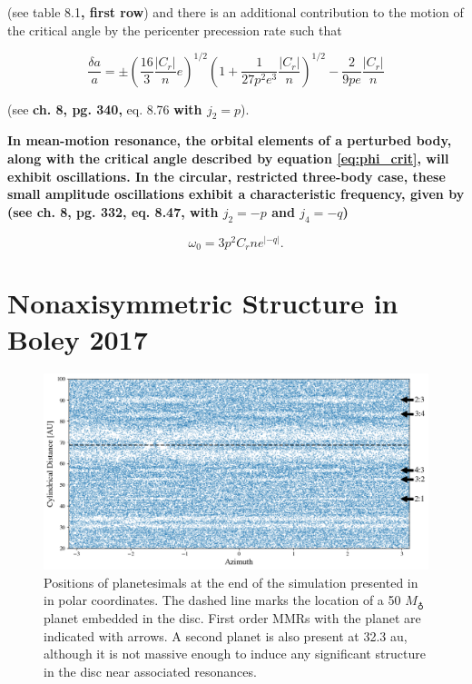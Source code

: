 \documentclass[fleqn,usenatbib]{mnras}
\begin{document}
\noindent (see \citet{1999ssd..book.....M} table 8.1\textbf{, first row}) and there is an additional contribution to the motion of the critical angle by the pericenter precession rate such that

\begin{equation}\label{eq:res_fo}
	\frac{\delta a}{a} = \pm \left(\frac{16}{3} \frac{\left| C_{r} \right|}{n} e \right)^{1/2} \left(  1 + \frac{1}{27 p^2 e^3} \frac{\left| C_{r} \right|}{n} 
	\right)^{1/2} - \frac{2}{9 p e}  \frac{\left| C_{r} \right|}{n}
\end{equation}

\noindent (see \citet{1999ssd..book.....M} \textbf{ch. 8, pg. 340,} eq. 8.76 \textbf{with $j_{2} = p$}).

\textbf{In mean-motion resonance, the orbital elements of a perturbed body, along with the critical angle described by equation \ref{eq:phi_crit}, will exhibit oscillations. In the circular, 
restricted three-body case, these small amplitude oscillations exhibit a characteristic frequency, given by (see \citet{1999ssd..book.....M} ch. 8, pg. 332, eq. 8.47, with $j_{2} =-p$ and 
$j_{4} = -q$)}

\begin{equation}\label{eq:lib_time}
	\omega_{0} = 3 p^{2} C_{r} n e^{\left| -q \right|}.
\end{equation}

\section{Nonaxisymmetric Structure in Boley 2017}\label{sec:boley_plot}

\begin{figure}
    \includegraphics[width=\textwidth]{figures/boley_rtheta.png}
    \caption{Positions of planetesimals at the end of the simulation presented in \citet{2017ApJ...850..103B} in polar coordinates. The dashed line marks the location of a 50 $M_{\earth}$ 
    planet embedded in the disc. First order MMRs with the planet are indicated with arrows. A second planet is also present at 32.3 au, although it is not massive enough to induce any 
    significant structure in the disc near associated resonances.\label{fig:boley_rtheta}}
\end{figure}
\end{document}
